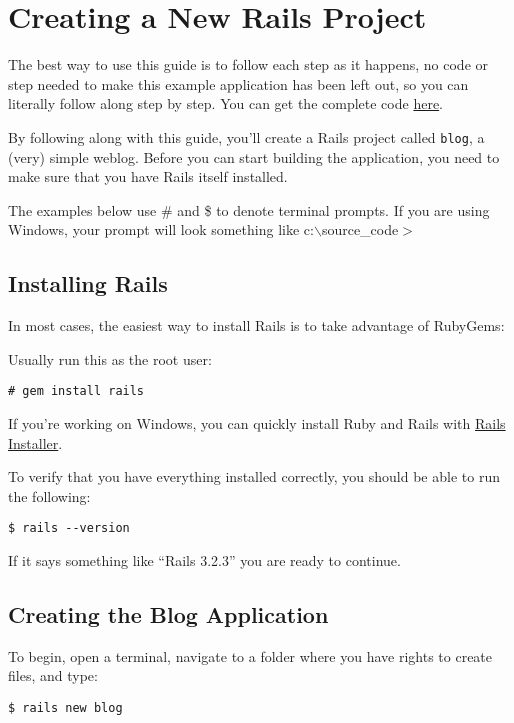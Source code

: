 \documentclass[10pt]{book}
\begin{document}
\section{ Creating a New Rails Project}

The best way to use this guide is to follow each step as it happens, no code or step needed to make this example application has been left out, so you can literally follow along step by step. You can get the complete code \href{https://github.com/lifo/docrails/tree/master/railties/guides/code/getting_started}{here}.

By following along with this guide, you’ll create a Rails project called \texttt{blog}, a (very) simple weblog. Before you can start building the application, you need to make sure that you have Rails itself installed.

The examples below use \# and \$ to denote terminal  prompts. If you are using Windows, your prompt will look something like  c:$\backslash$source\_code$>$

\subsection{ Installing Rails}

In most cases, the easiest way to install Rails is to take advantage of RubyGems:

Usually run this as the root user:
\begin{verbatim}
# gem install rails
\end{verbatim}

If you’re working on Windows, you can quickly install Ruby and Rails with \href{http://railsinstaller.org/}{Rails Installer}.

To verify that you have everything installed correctly, you should be able to run the following:
\begin{verbatim}
$ rails --version
\end{verbatim}

If it says something like “Rails 3.2.3” you are ready to continue.

\subsection{ Creating the Blog Application}

To begin, open a terminal, navigate to a folder where you have rights to create files, and type:
\begin{verbatim}
$ rails new blog
\end{verbatim}
\end{document}
